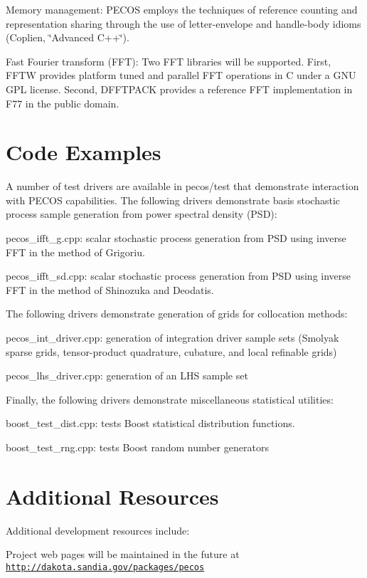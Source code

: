 \begin{DoxyItemize}
\item Memory management\+: P\+E\+C\+OS employs the techniques of reference counting and representation sharing through the use of letter-\/envelope and handle-\/body idioms (Coplien, \char`\"{}\+Advanced C++\char`\"{}). 
\item Fast Fourier transform (F\+FT)\+: Two F\+FT libraries will be supported. First, F\+F\+TW provides platform tuned and parallel F\+FT operations in C under a G\+NU G\+PL license. Second, D\+F\+F\+T\+P\+A\+CK provides a reference F\+FT implementation in F77 in the public domain. 
\end{DoxyItemize}\hypertarget{index_DevCodeEx}{}\section{Code Examples}\label{index_DevCodeEx}
A number of test drivers are available in {\ttfamily pecos/test} that demonstrate interaction with P\+E\+C\+OS capabilities. The following drivers demonstrate basis stochastic process sample generation from power spectral density (P\+SD)\+: 
\begin{DoxyItemize}
\item pecos\+\_\+ifft\+\_\+g.\+cpp\+: scalar stochastic process generation from P\+SD using inverse F\+FT in the method of Grigoriu. 
\item pecos\+\_\+ifft\+\_\+sd.\+cpp\+: scalar stochastic process generation from P\+SD using inverse F\+FT in the method of Shinozuka and Deodatis. 
\end{DoxyItemize}

The following drivers demonstrate generation of grids for collocation methods\+: 
\begin{DoxyItemize}
\item pecos\+\_\+int\+\_\+driver.\+cpp\+: generation of integration driver sample sets (Smolyak sparse grids, tensor-\/product quadrature, cubature, and local refinable grids) 
\item pecos\+\_\+lhs\+\_\+driver.\+cpp\+: generation of an L\+HS sample set


\end{DoxyItemize}

Finally, the following drivers demonstrate miscellaneous statistical utilities\+: 
\begin{DoxyItemize}
\item boost\+\_\+test\+\_\+dist.\+cpp\+: tests Boost statistical distribution functions. 
\item boost\+\_\+test\+\_\+rng.\+cpp\+: tests Boost random number generators 
\end{DoxyItemize}\hypertarget{index_DevAddtnl}{}\section{Additional Resources}\label{index_DevAddtnl}
Additional development resources include\+:

\begin{DoxyItemize}
\item Project web pages will be maintained in the future at \href{http://dakota.sandia.gov/packages/pecos}{\tt http\+://dakota.\+sandia.\+gov/packages/pecos} \end{DoxyItemize}
